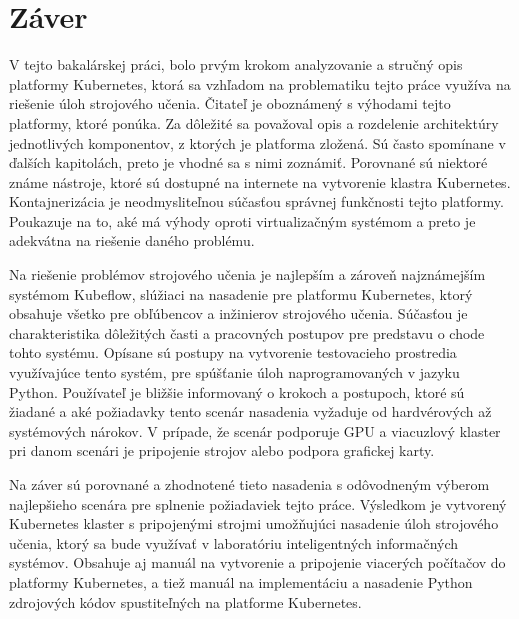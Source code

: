 
\chapter{Záver}
\label{summary}

V tejto bakalárskej práci, bolo prvým krokom analyzovanie a stručný opis platformy Kubernetes, ktorá sa vzhľadom na problematiku tejto práce využíva na riešenie úloh strojového učenia. Čitateľ je oboznámený s výhodami tejto platformy, ktoré ponúka. Za dôležité sa považoval opis a rozdelenie architektúry jednotlivých komponentov, z ktorých je platforma zložená. Sú často spomínane v ďalších kapitolách, preto je vhodné sa s nimi zoznámiť. Porovnané sú niektoré známe nástroje, ktoré sú dostupné na internete na vytvorenie klastra Kubernetes. Kontajnerizácia je neodmysliteľnou súčasťou správnej funkčnosti tejto platformy. Poukazuje na to, aké má výhody oproti virtualizačným systémom a preto je adekvátna na riešenie daného problému.

Na riešenie problémov strojového učenia je najlepším a zároveň najznámejším systémom Kubeflow, slúžiaci na nasadenie pre platformu Kubernetes, ktorý obsahuje všetko pre obľúbencov a inžinierov strojového učenia. Súčasťou je charakteristika dôležitých časti a pracovných postupov pre predstavu o chode tohto systému. Opísane sú postupy na vytvorenie testovacieho prostredia využívajúce tento systém, pre spúšťanie úloh naprogramovaných v jazyku Python. Používateľ je bližšie informovaný o krokoch a postupoch, ktoré sú žiadané a aké požiadavky tento scenár nasadenia vyžaduje od hardvérových až systémových nárokov. V prípade, že scenár podporuje GPU a viacuzlový klaster pri danom scenári je pripojenie strojov alebo podpora grafickej karty.

Na záver sú porovnané a zhodnotené tieto nasadenia s odôvodneným výberom najlepšieho scenára pre splnenie požiadaviek tejto práce. Výsledkom je vytvorený Kubernetes klaster s pripojenými strojmi umožňujúci nasadenie úloh strojového učenia, ktorý sa bude využívať v laboratóriu inteligentných informačných systémov. Obsahuje aj manuál na vytvorenie a pripojenie viacerých počítačov do platformy Kubernetes, a tiež manuál na implementáciu a nasadenie Python zdrojových kódov spustiteľných na platforme Kubernetes.